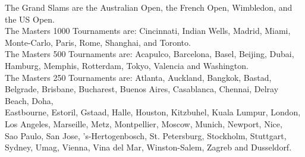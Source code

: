 \begin{frame}
{\tiny
The Grand Slams are the Australian Open, the French Open, Wimbledon, and the US Open.\\
The Masters 1000 Tournaments are: Cincinnati, Indian Wells, Madrid,
Miami, Monte-Carlo, Paris, Rome, Shanghai, and Toronto.\\
The Masters 500 Tournaments are: Acapulco, Barcelona, Basel, Beijing, Dubai, Hamburg, 
Memphis, Rotterdam, Tokyo, Valencia and Washington.\\
The Masters 250 Tournaments are: Atlanta, Auckland, Bangkok, Bastad, Belgrade, Brisbane,
Bucharest, Buenos Aires, Casablanca, Chennai, Delray Beach, Doha,\\
Eastbourne, Estoril, Gstaad, Halle, Houston, Kitzbuhel, Kuala Lumpur, London, Los Angeles, Marseille, Metz, Montpellier, Moscow, Munich, Newport, Nice,\\
Sao Paulo, San Jose, 's-Hertogenbosch, St. Petersburg, Stockholm, Stuttgart, Sydney, Umag, Vienna, Vina del Mar, Winston-Salem, Zagreb and Dusseldorf.\\
}
\end{frame}




